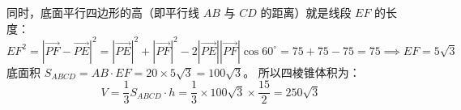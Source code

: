 {同时，底面平行四边形的高（即平行线 $AB$ 与 $CD$ 的距离）就是线段 $EF$ 的长度：
\[
EF^2 = |\overrightarrow{PF} - \overrightarrow{PE}|^2 = |\overrightarrow{PE}|^2 + |\overrightarrow{PF}|^2 - 2|\overrightarrow{PE}||\overrightarrow{PF}|\cos 60^\circ = 75 + 75 - 75 = 75 \implies EF = 5\sqrt{3}
\]
底面积 $S_{ABCD} = AB \cdot EF = 20 \times 5\sqrt{3} = 100\sqrt{3}$。
所以四棱锥体积为：
\[
V = \frac{1}{3} S_{ABCD} \cdot h = \frac{1}{3} \times 100\sqrt{3} \times \frac{15}{2} = 250\sqrt{3}
\]
}

